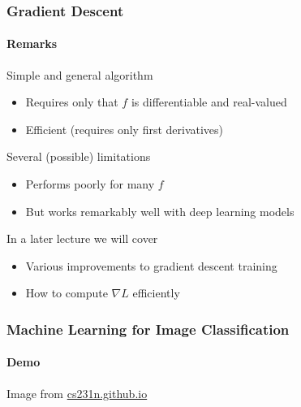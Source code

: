 \documentclass[xetex,professionalfont]{beamer}
\begin{document}
\begin{frame}
  \frametitle{Gradient Descent}
  \framesubtitle{Remarks}

Simple and general algorithm
\begin{itemize}
    \item Requires only that $f$ is differentiable and real-valued
    \item Efficient (requires only first derivatives)
\end{itemize}

\bigskip

Several (possible) limitations
\begin{itemize}
    \item Performs poorly for many $f$
    \item But works remarkably well with deep learning models
\end{itemize}

\bigskip

In a later lecture we will cover
\begin{itemize}
    \item Various improvements to gradient descent training
    \item How to compute $\nabla L$ efficiently
\end{itemize}

\end{frame}


\begin{frame}
  \frametitle{Machine Learning for Image Classification}
  \framesubtitle{Demo}
  
  \begin{center}
      {\centering Image from \href{http://vision.stanford.edu/teaching/cs231n-demos/linear-classify/}{cs231n.github.io}}
  \end{center}
  
\end{frame}
\end{document}
